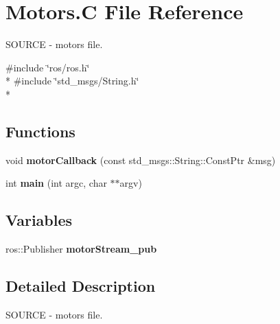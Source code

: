 \hypertarget{Motors_8C}{\section{Motors.\-C File Reference}
\label{Motors_8C}
}


S\-O\-U\-R\-C\-E -\/ motors file.  


{\ttfamily \#include \char`\"{}ros/ros.\-h\char`\"{}}\\*
{\ttfamily \#include \char`\"{}std\-\_\-msgs/\-String.\-h\char`\"{}}\\*
\subsection*{Functions}
\begin{DoxyCompactItemize}
\item 
\hypertarget{Motors_8C_a2c688cc695ddd0fe02f043502d2beae6}{void {\bfseries motor\-Callback} (const std\-\_\-msgs\-::\-String\-::\-Const\-Ptr \&msg)}\label{Motors_8C_a2c688cc695ddd0fe02f043502d2beae6}

\item 
\hypertarget{Motors_8C_a3c04138a5bfe5d72780bb7e82a18e627}{int {\bfseries main} (int argc, char $\ast$$\ast$argv)}\label{Motors_8C_a3c04138a5bfe5d72780bb7e82a18e627}

\end{DoxyCompactItemize}
\subsection*{Variables}
\begin{DoxyCompactItemize}
\item 
\hypertarget{Motors_8C_a513a68bcf99ae6280b951fd23006aa5e}{ros\-::\-Publisher {\bfseries motor\-Stream\-\_\-pub}}\label{Motors_8C_a513a68bcf99ae6280b951fd23006aa5e}

\end{DoxyCompactItemize}


\subsection{Detailed Description}
S\-O\-U\-R\-C\-E -\/ motors file. 
